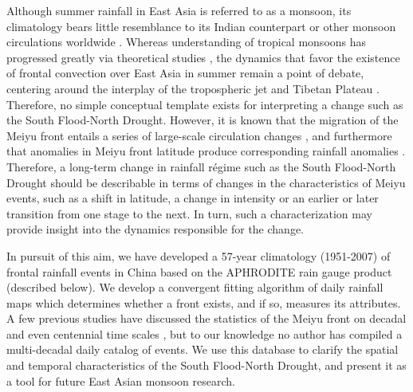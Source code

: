 \documentclass[draft,grl]{AGUTeX}
\begin{document}
\begin{article}
	Although summer rainfall in East Asia is referred to as a monsoon, its climatology bears little resemblance to its Indian counterpart or other monsoon circulations worldwide \citep{Ding2005}. Whereas understanding of tropical monsoons has progressed greatly via theoretical studies \citep{Plumb1992,Prive2007,Bordoni2008}, the dynamics that favor the existence of frontal convection over East Asia in summer remain a point of debate, centering around the interplay of the tropospheric jet and Tibetan Plateau \citep{Molnar2010,Sampe2010,Chen2014}. Therefore, no simple conceptual template exists for interpreting a change such as the South Flood-North Drought. However, it is known that the migration of the Meiyu front entails a series of large-scale circulation changes \citep{Chen2004}, and furthermore that anomalies in Meiyu front latitude produce corresponding rainfall anomalies \citep{Kosaka2011}. Therefore, a long-term change in rainfall r\'egime such as the South Flood-North Drought should be describable in terms of changes in the characteristics of Meiyu events, such as a shift in latitude, a change in intensity or an earlier or later transition from one stage to the next. In turn, such a characterization may provide insight into the dynamics responsible for the change.
	
	In pursuit of this aim, we have developed a 57-year climatology (1951-2007) of frontal rainfall events in China based on the APHRODITE rain gauge product (described below). We develop a convergent fitting algorithm of daily rainfall maps which determines whether a front exists, and if so, measures its attributes. A few previous studies have discussed the statistics of the Meiyu front on decadal and even centennial time scales \citep{Chen2004,Ge2008,Xu2009}, but to our knowledge no author has compiled a multi-decadal daily catalog of events. We use this database to clarify the spatial and temporal characteristics of the South Flood-North Drought, and present it as a tool for future East Asian monsoon research.
		

\end{article}
\end{document}

